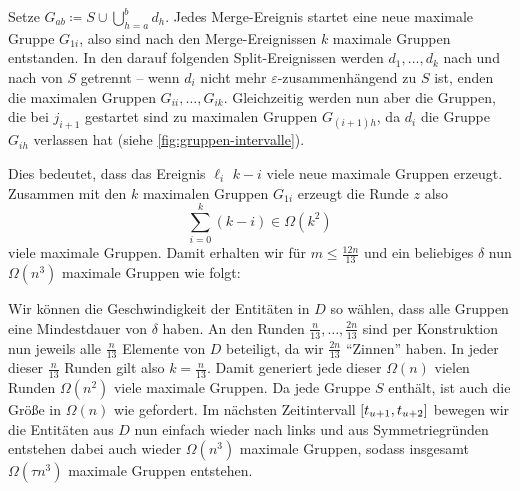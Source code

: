 \begin{beweis}
	Setze $G_{ab} \coloneqq S \cup \bigcup_{h=a}^b d_h$.
	Jedes Merge-Ereignis startet eine neue maximale Gruppe $G_{1i}$, also sind nach den Merge-Ereignissen $k$ maximale Gruppen entstanden.
	In den darauf folgenden Split-Ereignissen werden $d_1, \ldots , d_k$ nach und nach von $S$ getrennt -- wenn $d_i$ nicht mehr $\varepsilon$-zusammenhängend zu $S$ ist, enden die maximalen Gruppen $G_{ii}, \ldots , G_{ik}$.
	Gleichzeitig werden nun aber die Gruppen, die bei $j_{i+1}$ gestartet sind zu maximalen Gruppen $G_{(i+1)h}$, da $d_i$ die Gruppe $G_{ih}$ verlassen hat (siehe \cref{fig:gruppen-intervalle}).
	
	Dies bedeutet, dass das Ereignis $\ell_i$ $k-i$ viele neue maximale Gruppen erzeugt.
	Zusammen mit den $k$ maximalen Gruppen $G_{1i}$ erzeugt die Runde $z$ also
	\[
		\sum_{i=0}^{k} (k-i)  \in \Omega(k^2)
	\]
	viele maximale Gruppen.
	Damit erhalten wir für $m \le \frac{12n}{13}$ und ein beliebiges $\delta$ nun $\Omega(n^3)$ maximale Gruppen wie folgt:
	
	Wir können die Geschwindigkeit der Entitäten in $D$ so wählen, dass alle Gruppen eine Mindestdauer von $\delta$ haben.
	An den Runden $\frac{n}{13}, \ldots , \frac{2n}{13}$ sind per Konstruktion nun jeweils alle $\frac{n}{13}$ Elemente von $D$ beteiligt, da wir $\frac{2n}{13}$ \enquote{Zinnen} haben.
	In jeder dieser $\frac{n}{13}$ Runden gilt also $k=\frac{n}{13}$.
	Damit generiert jede dieser $\Omega(n)$ vielen Runden $\Omega(n^2)$ viele maximale Gruppen.
	Da jede Gruppe $S$ enthält, ist auch die Größe in $\Omega(n)$ wie gefordert.
	Im nächsten Zeitintervall $\benbrace*{t_{u+1}, t_{u+2}}$ bewegen wir die Entitäten aus $D$ nun einfach wieder nach links und aus Symmetriegründen entstehen dabei auch wieder $\Omega(n^3)$ maximale Gruppen, sodass insgesamt $\Omega(\tau n^3)$ maximale Gruppen entstehen.
\end{beweis}

